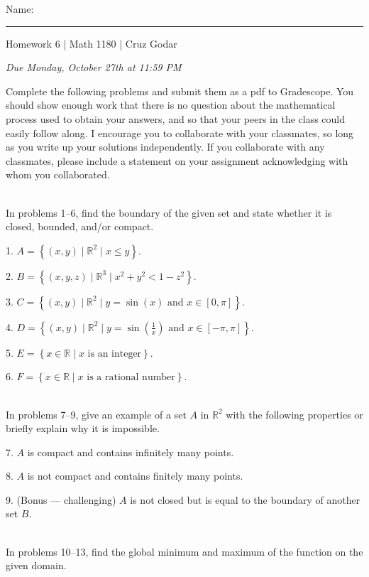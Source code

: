\documentclass{article}
\begin{document}
\Large Name: \rule{2in}{0.15mm} \hfill Homework 6 | Math 1180 | Cruz Godar \vspace{4pt} \normalsize

\textit{Due Monday, October 27th at 11:59 PM}

Complete the following problems and submit them as a pdf to Gradescope. You should show enough work that there is no question about the mathematical process used to obtain your answers, and so that your peers in the class could easily follow along. I encourage you to collaborate with your classmates, so long as you write up your solutions independently. If you collaborate with any classmates, please include a statement on your assignment acknowledging with whom you collaborated.

~\\

In problems 1--6, find the boundary of the given set and state whether it is closed, bounded, and/or compact.

1. $A = \left\{ (x, y) \mid \mathbb{R}^2 \mid x \leq y \right\}$.

2. $B = \left\{ (x, y, z) \mid \mathbb{R}^3 \mid x^2 + y^2 < 1 - z^2 \right\}$.

3. $C = \left\{ (x, y) \mid \mathbb{R}^2 \mid y = \sin(x) \text{ and } x \in [0, \pi] \right\}$.

4. $D = \left\{ (x, y) \mid \mathbb{R}^2 \mid y = \sin\left( \frac{1}{x} \right) \text{ and } x \in [-\pi, \pi] \right\}$.

5. $E = \left\{ x \in \mathbb{R} \mid x \text{ is an integer} \right\}$.

6. $F = \left\{ x \in \mathbb{R} \mid x \text{ is a rational number} \right\}$.

~\\

In problems 7--9, give an example of a set $A$ in $\mathbb{R}^2$ with the following properties or briefly explain why it is impossible.

7. $A$ is compact and contains infinitely many points.

8. $A$ is not compact and contains finitely many points.

9. (Bonus --- challenging) $A$ is not closed but is equal to the boundary of another set $B$.

~\\

In problems 10--13, find the global minimum and maximum of the function on the given domain.
\end{document}
